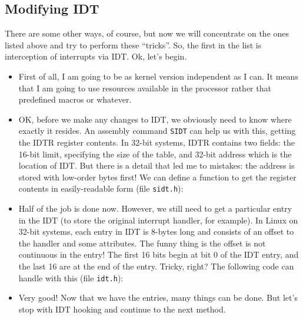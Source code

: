 \documentclass[12pt]{article}
\begin{document}
  \subsection{Modifying IDT}
  There are some other ways, of course, but now we will concentrate on the
  ones listed above and try to perform these ``tricks''. So, the first in the
  list is interception of interrupts via IDT. Ok, let's begin.
  \begin{itemize}
    \item First of all, I am going to be as kernel version independent as I
      can. It means that I am going to use resources available in the
      processor rather that predefined macros or whatever.
      
    \item OK, before we make any changes to IDT, we obviously need to
      know where exactly it resides. An assembly command \verb!SIDT!
      can help us with this, getting the IDTR register contents. In
      32-bit systems, IDTR contains two fields: the 16-bit limit,
      specifying the size of the table, and 32-bit address which is
      the location of IDT. But there is a detail that led me to
      mistakes: the address is stored with low-order bytes first! We
      can define a function to get the register contents in
      easily-readable form (file \verb!sidt.h!):
      

    \item Half of the job is done now. However, we still need to get a
      particular entry in the IDT (to store the original interrupt
      handler, for example). In Linux on 32-bit systems, each entry in
      IDT is 8-bytes long and consists of an offset to the handler and
      some attributes. The funny thing is the offset is not continuous
      in the entry! The first 16 bits begin at bit 0 of the IDT entry,
      and the last 16 are at the end of the entry. Tricky, right? The
      following code can handle with this (file \verb!idt.h!):
      

    \item Very good! Now that we have the entries, many things can be
      done. But let's stop with IDT hooking and continue to the next method.
  \end{itemize}
\end{document}
